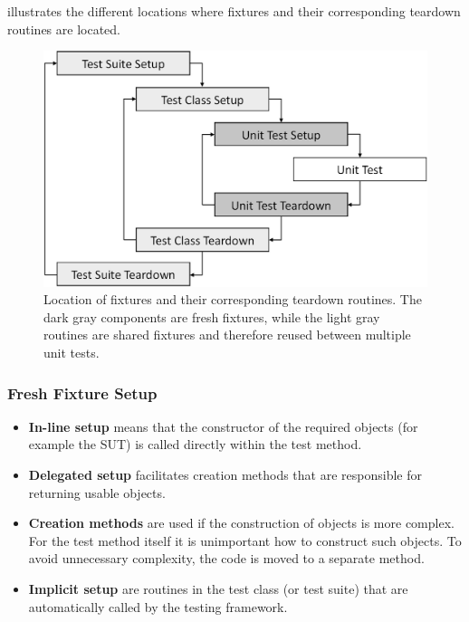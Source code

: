          illustrates the different locations where fixtures and their corresponding teardown routines are located.

        \begin{figure}[hbtp]
            \centering
            \includegraphics[width=0.9\columnwidth]{img/organisation_tests.jpg}
            \caption{Location of fixtures and their corresponding teardown routines. The dark gray components are fresh fixtures, while the light gray routines are shared fixtures and therefore reused between multiple unit tests.}
            \label{fig:TestOrganisationOfFixtures}
        \end{figure}

        \subsubsection{Fresh Fixture Setup}
            \begin{itemize}
                \item \textbf{In-line setup}
                        means that the constructor of the required objects (for example the SUT) is called directly within the test method.
                \item \textbf{Delegated setup}
                        facilitates creation methods that are responsible for returning usable objects.
                \item \textbf{Creation methods}
                        are used if the construction of objects is more complex.
                        For the test method itself it is unimportant how to construct such objects. To avoid unnecessary complexity, the code is moved to a separate method.
                \item \textbf{Implicit setup}
                        are  routines in the test class (or test suite) that are automatically called by the testing framework.
            \end{itemize}


